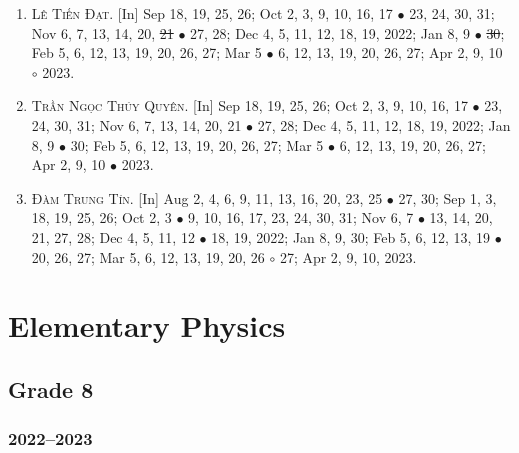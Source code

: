 \documentclass{article}
\begin{document}
\begin{enumerate}
	\item \textsc{Lê Tiến Đạt.} \textsf{[In]} Sep 18, 19, 25, 26; Oct 2, 3, 9, 10, 16, 17 $\bullet$ 23, 24, 30, 31; Nov 6, 7, 13, 14, 20, \st{21} $\bullet$ 27, 28; Dec 4, 5, 11, 12, 18, 19, 2022; Jan 8, 9 $\bullet$ \st{30}; Feb 5, 6, 12, 13, 19, 20, 26, 27; Mar 5 $\bullet$ 6, 12, 13, 19, 20, 26, 27; Apr 2, 9, 10 $\circ$ 2023.
	\item \textsc{Trần Ngọc Thúy Quyên.} \textsf{[In]} Sep 18, 19, 25, 26; Oct 2, 3, 9, 10, 16, 17 $\bullet$ 23, 24, 30, 31; Nov 6, 7, 13, 14, 20, 21 $\bullet$ 27, 28; Dec 4, 5, 11, 12, 18, 19, 2022; Jan 8, 9 $\bullet$ 30; Feb 5, 6, 12, 13, 19, 20, 26, 27; Mar 5 $\bullet$ 6, 12, 13, 19, 20, 26, 27; Apr 2, 9, 10 $\bullet$ 2023.
	\item \textsc{Đàm Trung Tín.} \textsf{[In]} Aug 2, 4, 6, 9, 11, 13, 16, 20, 23, 25 $\bullet$ 27, 30; Sep 1, 3, 18, 19, 25, 26; Oct 2, 3 $\bullet$ 9, 10, 16, 17, 23, 24, 30, 31; Nov 6, 7 $\bullet$ 13, 14, 20, 21, 27, 28; Dec 4, 5, 11, 12 $\bullet$ 18, 19, 2022; Jan 8, 9, 30; Feb 5, 6, 12, 13, 19 $\bullet$ 20, 26, 27; Mar 5, 6, 12, 13, 19, 20, 26 $\circ$ 27; Apr 2, 9, 10, 2023.
\end{enumerate}


\section{Elementary Physics}

\subsection{Grade 8}

\subsubsection{2022--2023}
\end{document}
